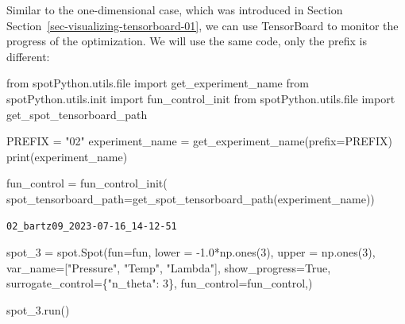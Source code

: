 \documentclass[
  letterpaper,
  DIV=11,
  numbers=noendperiod]{scrreprt}
\newenvironment{Shaded}{\begin{snugshade}}{\end{snugshade}}
\newcommand{\BuiltInTok}[1]{\textcolor[rgb]{0.00,0.23,0.31}{#1}}
\newcommand{\DecValTok}[1]{\textcolor[rgb]{0.68,0.00,0.00}{#1}}
\newcommand{\FloatTok}[1]{\textcolor[rgb]{0.68,0.00,0.00}{#1}}
\newcommand{\ImportTok}[1]{\textcolor[rgb]{0.00,0.46,0.62}{#1}}
\newcommand{\NormalTok}[1]{\textcolor[rgb]{0.00,0.23,0.31}{#1}}
\newcommand{\OperatorTok}[1]{\textcolor[rgb]{0.37,0.37,0.37}{#1}}
\newcommand{\StringTok}[1]{\textcolor[rgb]{0.13,0.47,0.30}{#1}}
\newcommand{\VariableTok}[1]{\textcolor[rgb]{0.07,0.07,0.07}{#1}}
\begin{document}
\begin{tcolorbox}[enhanced jigsaw, titlerule=0mm, colbacktitle=quarto-callout-note-color!10!white, coltitle=black, arc=.35mm, toptitle=1mm, colback=white, left=2mm, opacityback=0, bottomtitle=1mm, bottomrule=.15mm, breakable, opacitybacktitle=0.6, colframe=quarto-callout-note-color-frame, rightrule=.15mm, toprule=.15mm, leftrule=.75mm, title=\textcolor{quarto-callout-note-color}{\faInfo}\hspace{0.5em}{TensorBoard}]

Similar to the one-dimensional case, which was introduced in Section
Section~\ref{sec-visualizing-tensorboard-01}, we can use TensorBoard to
monitor the progress of the optimization. We will use the same code,
only the prefix is different:

\begin{Shaded}
\begin{Highlighting}[]
\ImportTok{from}\NormalTok{ spotPython.utils.}\BuiltInTok{file} \ImportTok{import}\NormalTok{ get\_experiment\_name}
\ImportTok{from}\NormalTok{ spotPython.utils.init }\ImportTok{import}\NormalTok{ fun\_control\_init}
\ImportTok{from}\NormalTok{ spotPython.utils.}\BuiltInTok{file} \ImportTok{import}\NormalTok{ get\_spot\_tensorboard\_path}

\NormalTok{PREFIX }\OperatorTok{=} \StringTok{"02"}
\NormalTok{experiment\_name }\OperatorTok{=}\NormalTok{ get\_experiment\_name(prefix}\OperatorTok{=}\NormalTok{PREFIX)}
\BuiltInTok{print}\NormalTok{(experiment\_name)}

\NormalTok{fun\_control }\OperatorTok{=}\NormalTok{ fun\_control\_init(}
\NormalTok{    spot\_tensorboard\_path}\OperatorTok{=}\NormalTok{get\_spot\_tensorboard\_path(experiment\_name))}
\end{Highlighting}
\end{Shaded}

\begin{verbatim}
02_bartz09_2023-07-16_14-12-51
\end{verbatim}

\end{tcolorbox}

\begin{Shaded}
\begin{Highlighting}[]
\NormalTok{spot\_3 }\OperatorTok{=}\NormalTok{ spot.Spot(fun}\OperatorTok{=}\NormalTok{fun,}
\NormalTok{                   lower }\OperatorTok{=} \OperatorTok{{-}}\FloatTok{1.0}\OperatorTok{*}\NormalTok{np.ones(}\DecValTok{3}\NormalTok{),}
\NormalTok{                   upper }\OperatorTok{=}\NormalTok{ np.ones(}\DecValTok{3}\NormalTok{),}
\NormalTok{                   var\_name}\OperatorTok{=}\NormalTok{[}\StringTok{"Pressure"}\NormalTok{, }\StringTok{"Temp"}\NormalTok{, }\StringTok{"Lambda"}\NormalTok{],}
\NormalTok{                   show\_progress}\OperatorTok{=}\VariableTok{True}\NormalTok{,}
\NormalTok{                   surrogate\_control}\OperatorTok{=}\NormalTok{\{}\StringTok{"n\_theta"}\NormalTok{: }\DecValTok{3}\NormalTok{\},}
\NormalTok{                   fun\_control}\OperatorTok{=}\NormalTok{fun\_control,)}

\NormalTok{spot\_3.run()}
\end{Highlighting}
\end{Shaded}
\end{document}
